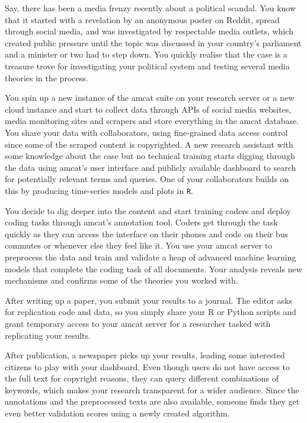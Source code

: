 \documentclass[
  letterpaper,
  DIV=11,
  numbers=noendperiod]{scrreprt}
\begin{document}
\begin{tcolorbox}[enhanced jigsaw, coltitle=black, breakable, title=\textcolor{quarto-callout-tip-color}{\faLightbulb}\hspace{0.5em}{An example workflow}, left=2mm, arc=.35mm, colback=white, colframe=quarto-callout-tip-color-frame, toptitle=1mm, opacityback=0, bottomrule=.15mm, rightrule=.15mm, leftrule=.75mm, opacitybacktitle=0.6, bottomtitle=1mm, titlerule=0mm, toprule=.15mm, colbacktitle=quarto-callout-tip-color!10!white]

Say, there has been a media frenzy recently about a political scandal.
You know that it started with a revelation by an anonymous poster on
Reddit, spread through social media, and was investigated by respectable
media outlets, which created public pressure until the topic was
discussed in your country's parliament and a minister or two had to step
down. You quickly realise that the case is a treasure trove for
investigating your political system and testing several media theories
in the process.

You spin up a new instance of the amcat suite on your research server or
a new cloud instance and start to collect data through APIs of social
media websites, media monitoring sites and scrapers and store everything
in the amcat database. You share your data with collaborators, using
fine-grained data access control since some of the scraped content is
copyrighted. A new research assistant with some knowledge about the case
but no technical training starts digging through the data using amcat's
user interface and publicly available dashboard to search for
potentially relevant terms and queries. One of your collaborators builds
on this by producing time-series models and plots in \texttt{R}.

You decide to dig deeper into the content and start training coders and
deploy coding tasks through amcat's annotation tool. Coders get through
the task quickly as they can access the interface on their phones and
code on their bus commutes or whenever else they feel like it. You use
your amcat server to preprocess the data and train and validate a heap
of advanced machine learning models that complete the coding task of all
documents. Your analysis reveals new mechanisms and confirms some of the
theories you worked with.

After writing up a paper, you submit your results to a journal. The
editor asks for replication code and data, so you simply share your R or
Python scripts and grant temporary access to your amcat server for a
researcher tasked with replicating your results.

After publication, a newspaper picks up your results, leading some
interested citizens to play with your dashboard. Even though users do
not have access to the full text for copyright reasons, they can query
different combinations of keywords, which makes your research
transparent for a wider audience. Since the annotations and the
preprocessed texts are also available, someone finds they get even
better validation scores using a newly created algorithm.

\end{tcolorbox}
\end{document}
